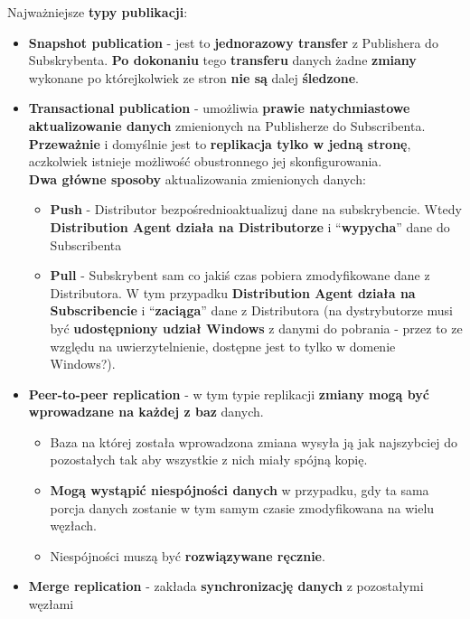 \documentclass[a4paper]{article}
\begin{document}
    Najważniejsze \textbf{typy publikacji}:
    \begin{itemize}[noitemsep]
        \item \textbf{Snapshot publication} - jest to \textbf{jednorazowy transfer} z Publishera do Subskrybenta.
        \textbf{Po dokonaniu} tego \textbf{transferu} danych żadne \textbf{zmiany} wykonane po którejkolwiek ze stron
        \textbf{nie są} dalej \textbf{śledzone}.
        \item \textbf{Transactional publication} - umożliwia \textbf{prawie natychmiastowe aktualizowanie danych}
        zmienionych na Publisherze do Subscribenta. \textbf{Przeważnie} i domyślnie jest to \textbf{replikacja tylko w
        jedną stronę}, aczkolwiek istnieje możliwość obustronnego jej skonfigurowania.\\
        \textbf{Dwa główne sposoby} aktualizowania zmienionych danych:
        \begin{itemize}[noitemsep]
            \item \textbf{Push} - Distributor bezpośrednioaktualizuj dane na subskrybencie. Wtedy
            \textbf{Distribution Agent działa na Distributorze} i ``\textbf{wypycha}'' dane do Subscribenta
            \item \textbf{Pull} - Subskrybent sam co jakiś czas pobiera zmodyfikowane dane z
            Distributora. W tym przypadku \textbf{Distribution Agent działa na Subscribencie} i ``\textbf{zaciąga}''
            dane z Distributora (na dystrybutorze musi być \textbf{udostępniony udział Windows} z danymi do pobrania -
            przez to ze względu na uwierzytelnienie, dostępne jest to tylko w domenie Windows?).
        \end{itemize}
        \item \textbf{Peer-to-peer replication} - w tym typie replikacji \textbf{zmiany mogą być wprowadzane na każdej
        z baz} danych.
        \begin{itemize}[noitemsep]
            \item Baza na której została wprowadzona zmiana wysyła ją jak najszybciej do pozostałych tak aby wszystkie
            z nich miały spójną kopię.
            \item \textbf{Mogą wystąpić niespójności danych} w przypadku, gdy ta sama porcja danych zostanie w tym
            samym czasie zmodyfikowana na wielu węzłach.
            \item Niespójności muszą być \textbf{rozwiązywane ręcznie}.
        \end{itemize}
        \item \textbf{Merge replication} - zakłada \textbf{synchronizację danych} z pozostałymi węzłami

\end{itemize}
\end{document}

